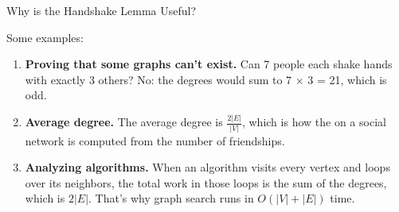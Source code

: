 \documentclass[10pt]{beamer}
\begin{document}
\begin{frame}{Why is the Handshake Lemma Useful?}

Some examples:
\begin{enumerate}
	\item \textbf{Proving that some graphs can’t exist.} Can 7 people each shake hands with exactly 3 others? No: the degrees would sum to 7 × 3 = 21, which is odd. \pause 
	\item \textbf{Average degree.} The average degree is $\frac{2|E|}{|V|}$, which is how the  on a social network is computed from the number of friendships. \pause 
	\item \textbf{Analyzing algorithms.} When an algorithm visits every vertex and loops over its neighbors, the total work in those loops is the sum of the degrees, which is $2|E|$. That’s why graph search runs in $O(|V| + |E|)$ time.
\end{enumerate}
\end{frame}

\end{document}
